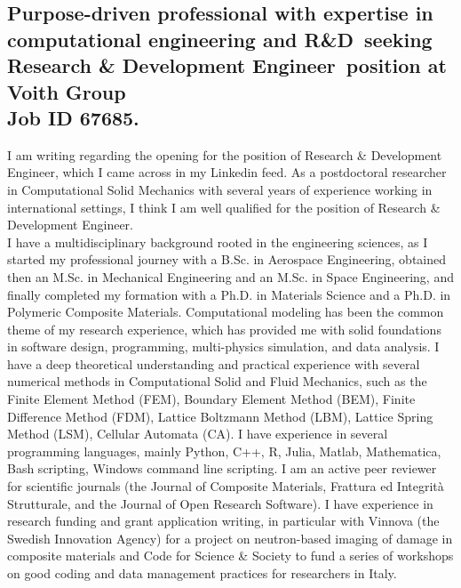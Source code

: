 \documentclass[
  a4paper, 
]{fortysecondscv}
\def\expertise{computational engineering and R\&D}
\def\position{Research \& Development Engineer}
\def\company{Voith Group}
\def\jobsource{my Linkedin feed}
\def\reference{\\[6pt] Job ID 67685}
\def\salutation{Luzia}
\begin{document}
\makefrontsidebar

\cvsignature
\vspace*{12pt}
\subsection{\textbf{Purpose-driven professional with expertise in \expertise\ seeking \position\ position at \company\reference.}}
\vspace*{12pt}
I am writing regarding the opening for the position of \position, which I came across in \jobsource. As a postdoctoral researcher in Computational Solid Mechanics with several years of experience working in international settings, I think I am well qualified for the position of \position.\\[8pt]
I have a multidisciplinary background rooted in the engineering sciences, as I started my professional journey with a B.Sc. in Aerospace Engineering, obtained then an M.Sc. in Mechanical Engineering and an M.Sc. in Space Engineering, and finally completed my formation with a Ph.D. in Materials Science and a Ph.D. in Polymeric Composite Materials. Computational modeling has been the common theme of my research experience, which has provided me with solid foundations in software design, programming, multi-physics simulation, and data analysis. I have a deep theoretical understanding and practical experience with several numerical methods in Computational Solid and Fluid Mechanics, such as the Finite Element Method (FEM), Boundary Element Method (BEM), Finite Difference Method (FDM), Lattice Boltzmann Method (LBM), Lattice Spring Method (LSM), Cellular Automata (CA). I have experience in several programming languages, mainly Python, C++, R, Julia, Matlab, Mathematica, Bash scripting, Windows command line scripting. I am an active peer reviewer for scientific journals (the Journal of Composite Materials, Frattura ed Integrità Strutturale, and the Journal of Open Research Software). I have experience in research funding and grant application writing, in particular with Vinnova (the Swedish Innovation Agency) for a project on neutron-based imaging of damage in composite materials and Code for Science \& Society to fund a series of workshops on good coding and data management practices for researchers in Italy.\\[8pt]
\end{document}
